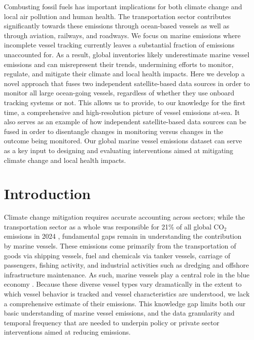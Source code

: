 \documentclass[lineno,pdflatex,sn-nature]{sn-jnl}
\begin{document}
 Combusting fossil fuels has important implications for both climate change and local air pollution and human health. The transportation sector contributes significantly towards these emissions through ocean-based vessels as well as through aviation, railways, and roadways. We focus on marine emissions where incomplete vessel tracking currently leaves a substantial fraction of emissions unaccounted for. As a result, global inventories likely underestimate marine vessel emissions and can misrepresent their trends, undermining efforts to monitor, regulate, and mitigate their climate and local health impacts. Here we develop a novel approach that fuses two independent satellite-based data sources in order to monitor all large ocean-going vessels, regardless of whether they use onboard tracking systems or not. This allows us to provide, to our knowledge for the first time, a comprehensive and high-resolution picture of vessel emissions at-sea. It also serves as an example of how independent satellite-based data sources can be fused in order to disentangle changes in monitoring versus changes in the outcome being monitored. Our global marine vessel emissions dataset can serve as a key input to designing and evaluating interventions aimed at mitigating climate change and local health impacts.

\section{Introduction}

Climate change mitigation requires accurate accounting across sectors; while the transportation sector as a whole was responsible for 21\% of all global CO$_{2}$ emissions in 2024 \cite{JRC143227}, fundamental gaps remain in understanding the contribution by marine vessels. These emissions come primarily from the transportation of goods via shipping vessels, fuel and chemicals via tanker vessels, carriage of passengers, fishing activity, and industrial activities such as dredging and offshore infrastructure maintenance. As such, marine vessels play a central role in the blue economy \cite{spalding2016new}. Because these diverse vessel types vary dramatically in the extent to which vessel behavior is tracked and vessel characteristics are understood, we lack a comprehensive estimate of their emissions. This knowledge gap limits both our basic understanding of marine vessel emissions, and the data granularity and temporal frequency that are needed to underpin policy or private sector interventions aimed at reducing emissions.
\end{document}
